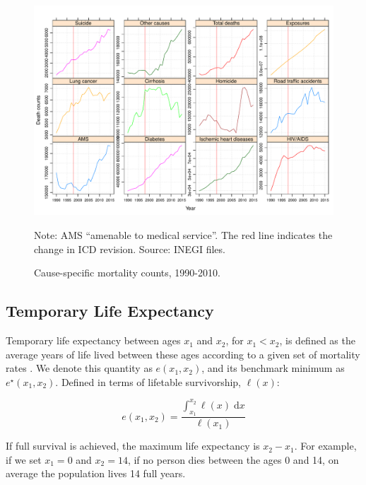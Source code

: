 \documentclass[11.5pt]{article}
\newcommand{\dd}{\; \mathrm{d}}
\begin{document}
{\begin{figure}
\centering
\caption{Cause-specific mortality counts, 1990-2010.}
\label{fig:ClassSens}
\includegraphics[scale=.6]{Sensitivity_fig.pdf}

Note: AMS ``amenable to medical service''. The red line indicates the change in ICD revision. Source: INEGI files. 
\end{figure}



\subsection*{Temporary Life Expectancy}
Temporary life expectancy between ages
$x_1$ and $x_2$, for $x_1<x_2$, is defined as the average years of life lived between these ages according to a given set of mortality rates \citep{arriaga1984}. We denote this quantity as
$e(x_1,x_2)$, and its benchmark minimum as $e^{\star}(x_1,x_2)$. Defined in
terms of lifetable survivorship, $\ell(x)$:

\begin{equation}
e(x_1,x_2) = \frac{\int _{x_1}^{x_2} \ell(x) \dd x}{\ell(x_1)}
\end{equation}

If full survival is achieved, the maximum life expectancy is $x_2-x_1$.  For example, if we set $x_1=0$ and $x_2=14$, if no person dies between the ages 0 and 14, on average the population lives 14 full years.


}
\end{document}
